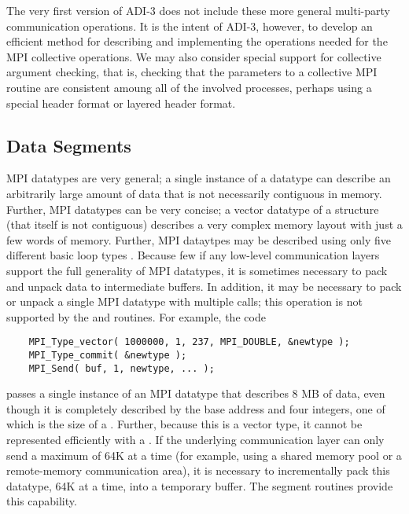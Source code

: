 The very first version of ADI-3 does not include these more general
multi-party communication operations.  It is the intent of ADI-3,
however, to develop an efficient method for describing and
implementing the operations needed for the MPI collective operations.
We may also consider special support for collective argument checking,
that is, checking that the parameters to a collective MPI routine are
consistent amoung all of the involved processes, perhaps using a
special header format or layered header format.

\subsection{Data Segments}
\label{sec:segment}

MPI datatypes are very general; a single instance of a datatype can
describe an arbitrarily large amount of data that is not necessarily
contiguous in memory.  Further, MPI datatypes can be very concise;
a vector datatype of a structure (that itself is not contiguous)
describes a very complex memory layout with just a few words of
memory.  Further, MPI dataytpes may be described using only five
different basic loop types \cite{datatype1,datatype2}.
Because few if any low-level communication layers support the
full generality of MPI datatypes, it is sometimes necessary to pack
and unpack data to intermediate buffers.  In addition, it may be
necessary to pack or unpack a single MPI datatype with multiple calls;
this operation is not supported by the  and
 routines.  For example, the code
\begin{verbatim}
    MPI_Type_vector( 1000000, 1, 237, MPI_DOUBLE, &newtype );
    MPI_Type_commit( &newtype );
    MPI_Send( buf, 1, newtype, ... );
\end{verbatim}
passes a single instance of an MPI datatype that describes 8 MB of
data, even though it is completely described by the base address and
four integers, one of which is the size of a .
Further, because this is a vector type, it cannot be
represented efficiently with a .  If the
underlying communication layer can only send a maximum of 64K at a
time (for example, using a shared memory pool or a remote-memory
communication area), it is necessary to incrementally pack this
datatype, 64K at a time, into a temporary buffer.  The segment
routines provide this capability.

